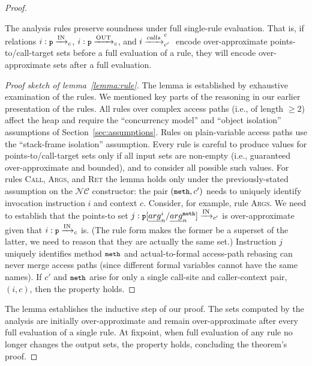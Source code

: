 \begin{theorem}
\begin{proof}
  \begin{lemma}
    The analysis rules preserve soundness under full single-rule evaluation. That
    is, if relations \({{i}: {{\small {\texttt{p}}}} \xrightarrow{\text{IN}}_{c} }\),
    \({{i}: {{\small {\texttt{p}}}} \xrightarrow{\text{OUT}}_{c} }\), and \({i} \xrightarrow{calls}^{c}_{c'} {}\) encode
    over-approximate points-to/call-target sets before a full evaluation of a rule, they
    will encode over-approximate sets after a full evaluation.
  \label{lemma:rule}
  \end{lemma}
  \begin{proof}[Proof sketch of lemma~\ref{lemma:rule}]
  The lemma is established by exhaustive examination of the rules.  We
  mentioned key parts of the reasoning in our earlier presentation of
  the rules. All rules over complex access paths (i.e., of length
  \(\geq 2\)) affect the heap and require the ``concurrency model'' and
  ``object isolation'' assumptions of
  Section~\ref{sec:assumptions}. Rules on plain-variable access paths
  use the ``stack-frame isolation'' assumption. Every rule is careful
  to produce values for points-to/call-target sets only if all input
  sets are non-empty (i.e., guaranteed over-approximate and bounded),
  and to consider all possible such values.  For
  rules \textsc{Call}, \textsc{Args}, and \textsc{Ret} the lemma holds
  only under the previously-stated assumption on the \(\mathcal{NC}\)
  constructor: the pair \(({\small {\texttt{meth}}},c')\) needs to uniquely identify
  invocation instruction \(i\) and context \(c\). Consider, for
  example, rule \textsc{Args}. We need to establish that the
  points-to set
  \({{j}: {{\small {\texttt{p}}}[{{\emph{arg}}^{i}_{n}}/{{\emph{arg}}^{{\small {\texttt{meth}}}}_{n}}]} \xrightarrow{\text{IN}}_{c'} }\)
  is over-approximate given that \({{i}: {{\small {\texttt{p}}}} \xrightarrow{\text{IN}}_{c} }\) is. (The
  rule form makes the former be a superset of the latter, we need to reason
  that they are actually the same set.)  Instruction \(j\)
  uniquely identifies method \({\small {\texttt{meth}}}\) and actual-to-formal access-path
  rebasing can never merge access paths (since different formal variables
  cannot have the same names). If \(c'\) and
  \({\small {\texttt{meth}}}\) arise for only a single call-site and caller-context
  pair, \((i,c)\), then the property holds.
  \end{proof}

  The lemma establishes the inductive step of our proof. The sets computed
  by the analysis are initially over-approximate and remain over-approximate
  after every full evaluation of a single rule. At fixpoint, when full
  evaluation of any rule no longer changes the output sets, the property holds,
  concluding the theorem's proof.
\end{proof}
\end{theorem}

